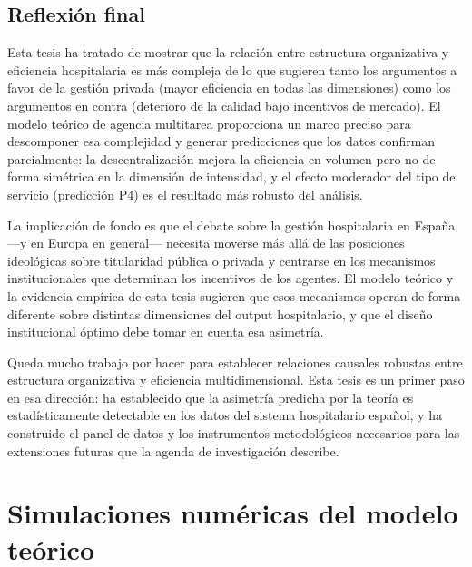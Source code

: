 \documentclass[12pt, a4paper, twoside, openright]{book}
\theoremstyle{plain}
\theoremstyle{definition}
\theoremstyle{remark}
\begin{document}
\section{Reflexión final}

Esta tesis ha tratado de mostrar que la relación entre estructura organizativa y eficiencia hospitalaria es más compleja de lo que sugieren tanto los argumentos a favor de la gestión privada (mayor eficiencia en todas las dimensiones) como los argumentos en contra (deterioro de la calidad bajo incentivos de mercado). El modelo teórico de agencia multitarea proporciona un marco preciso para descomponer esa complejidad y generar predicciones que los datos confirman parcialmente: la descentralización mejora la eficiencia en volumen pero no de forma simétrica en la dimensión de intensidad, y el efecto moderador del tipo de servicio (predicción P4) es el resultado más robusto del análisis.

La implicación de fondo es que el debate sobre la gestión hospitalaria en España ---y en Europa en general--- necesita moverse más allá de las posiciones ideológicas sobre titularidad pública o privada y centrarse en los mecanismos institucionales que determinan los incentivos de los agentes. El modelo teórico y la evidencia empírica de esta tesis sugieren que esos mecanismos operan de forma diferente sobre distintas dimensiones del output hospitalario, y que el diseño institucional óptimo debe tomar en cuenta esa asimetría.

Queda mucho trabajo por hacer para establecer relaciones causales robustas entre estructura organizativa y eficiencia multidimensional. Esta tesis es un primer paso en esa dirección: ha establecido que la asimetría predicha por la teoría es estadísticamente detectable en los datos del sistema hospitalario español, y ha construido el panel de datos y los instrumentos metodológicos necesarios para las extensiones futuras que la agenda de investigación describe.



\appendix

\chapter{Simulaciones numéricas del modelo teórico}
\label{app:simulaciones}
\end{document}
